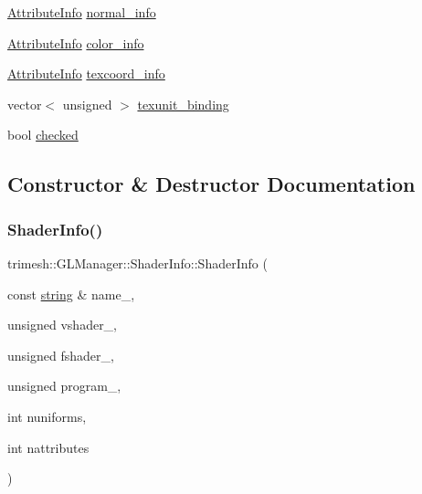 \begin{DoxyCompactItemize}
\item 
\hyperlink{structtrimesh_1_1GLManager_1_1AttributeInfo}{Attribute\+Info} \hyperlink{classtrimesh_1_1GLManager_1_1ShaderInfo_ac1219b6e332273cd98ae9ae52ce170c3}{normal\+\_\+info}
\item 
\hyperlink{structtrimesh_1_1GLManager_1_1AttributeInfo}{Attribute\+Info} \hyperlink{classtrimesh_1_1GLManager_1_1ShaderInfo_ab69d6596bd9e121a47ded82d20bc1b47}{color\+\_\+info}
\item 
\hyperlink{structtrimesh_1_1GLManager_1_1AttributeInfo}{Attribute\+Info} \hyperlink{classtrimesh_1_1GLManager_1_1ShaderInfo_a3639b7ec779911da900bf1e037faef39}{texcoord\+\_\+info}
\item 
vector$<$ unsigned $>$ \hyperlink{classtrimesh_1_1GLManager_1_1ShaderInfo_a3e8e7ea3654fdaeef555c3940a7f7591}{texunit\+\_\+binding}
\item 
bool \hyperlink{classtrimesh_1_1GLManager_1_1ShaderInfo_ae673a8e20f8d974b8b8603b5fbdfcba7}{checked}
\end{DoxyCompactItemize}


\subsection{Constructor \& Destructor Documentation}
\mbox{\label{classtrimesh_1_1GLManager_1_1ShaderInfo_a930aa666ff8c7b9a7004077be432adfb}} 
\subsubsection{\texorpdfstring{Shader\+Info()}{ShaderInfo()}}
{\footnotesize\ttfamily trimesh\+::\+G\+L\+Manager\+::\+Shader\+Info\+::\+Shader\+Info (\begin{DoxyParamCaption}\item[{const \hyperlink{namespacetrimesh_a51b4a31323874089623d4b17afabc1aa}{string} \&}]{name\+\_\+,  }\item[{unsigned}]{vshader\+\_\+,  }\item[{unsigned}]{fshader\+\_\+,  }\item[{unsigned}]{program\+\_\+,  }\item[{int}]{nuniforms,  }\item[{int}]{nattributes }\end{DoxyParamCaption})\hspace{0.3cm}{\ttfamily [inline]}}



